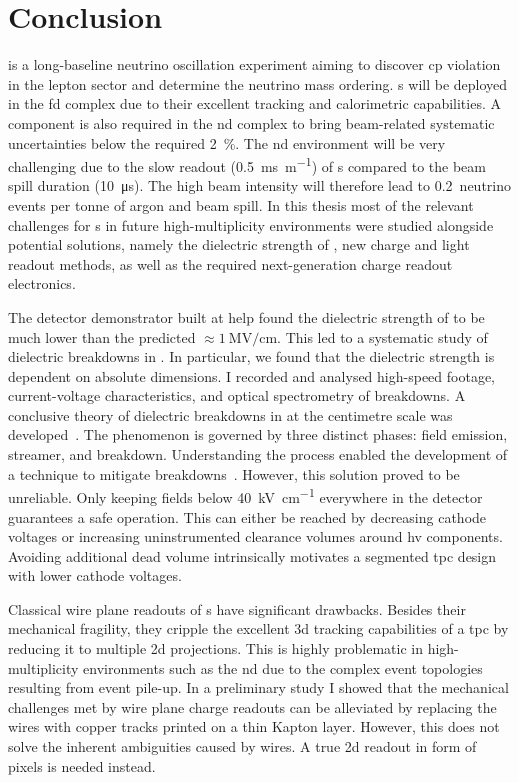 \chapter{Conclusion}
\label{chap:conclusion}

\dune{} is a long-baseline neutrino oscillation experiment aiming to discover \gls{cp} violation in the lepton sector and determine the neutrino mass ordering.
\lartpc{}s will be deployed in the \gls{fd} complex due to their excellent tracking and calorimetric capabilities.
A \lartpc{} component is also required in the \gls{nd} complex to bring beam-related systematic uncertainties below the required \SI{2}{\percent}.
The \gls{nd} environment will be very challenging due to the slow readout (\SI{0.5}{\milli\second\per\metre}) of \lartpc{}s compared to the beam spill duration (\SI{10}{\micro\second}).
The high beam intensity will therefore lead to \num{0.2}~neutrino events per tonne of argon and beam spill.
In this thesis most of the relevant challenges for \lartpc{}s in future high-multiplicity environments were studied alongside potential solutions, namely the dielectric strength of \lar{}, new charge and light readout methods, as well as the required next-generation charge readout electronics.

The \AT{} detector demonstrator built at \gls{help} found the dielectric strength of \lar{} to be much lower than the predicted $\approx \SI{1}{\mega\volt\per\centi\metre}$.
This led to a systematic study of dielectric breakdowns in \lar{}.
In particular, we found that the dielectric strength is dependent on absolute dimensions.
I recorded and analysed high-speed footage, current-voltage characteristics, and optical spectrometry of breakdowns.
A conclusive theory of dielectric breakdowns in \lar{} at the centimetre scale was developed~\cite{breakdown_16}.
The phenomenon is governed by three distinct phases: field emission, streamer, and breakdown.
Understanding the process enabled the development of a technique to mitigate breakdowns~\cite{latex}.
However, this solution proved to be unreliable.
Only keeping fields below \SI{40}{\kilo\volt\per\centi\metre} everywhere in the detector guarantees a safe operation.
This can either be reached by decreasing cathode voltages or increasing uninstrumented clearance volumes around \gls{hv} components.
Avoiding additional dead \lar{} volume intrinsically motivates a segmented \gls{tpc} design with lower cathode voltages.

Classical wire plane readouts of \lartpc{}s have significant drawbacks.
Besides their mechanical fragility, they cripple the excellent \gls{3d} tracking capabilities of a \gls{tpc} by reducing it to multiple \gls{2d} projections.
This is highly problematic in high-multiplicity environments such as the \dune{} \gls{nd} due to the complex event topologies resulting from event pile-up.
In a preliminary study I showed that the mechanical challenges met by wire plane charge readouts can be alleviated by replacing the wires with copper tracks printed on a thin Kapton layer.
However, this does not solve the inherent ambiguities caused by wires.
A true \gls{2d} readout in form of pixels is needed instead.

